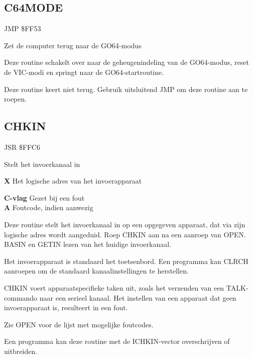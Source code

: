 \subsection{C64MODE}
\label{KERNAL Jump Table!C64MODE}
\begin{description}[leftmargin=2cm,style=nextline]
    \item [Adres:] JMP \$FF53    \item [Omschrijving:] Zet de computer terug naar de GO64-modus    \item [Opmerkingen:]        Deze routine schakelt over naar de geheugenindeling van de GO64-modus, reset de VIC-modi en springt naar de GO64-startroutine.

        Deze routine keert niet terug. Gebruik uitsluitend JMP om deze routine aan te roepen.    \item [Voorbeeld:]
\end{description}



\newpage
\subsection{CHKIN}
\label{KERNAL Jump Table!CHKIN}
\begin{description}[leftmargin=2cm,style=nextline]
    \item [Adres:] JSR \$FFC6    \item [Omschrijving:] Stelt het invoerkanaal in    \item [Invoer:]        \textbf{X} Het logische adres van het invoerapparaat    \item [Uitvoer:]        \textbf{C-vlag} Gezet bij een fout \\        \textbf{A} Foutcode, indien aanwezig    \item [Opmerkingen:]        Deze routine stelt het invoerkanaal in op een opgegeven apparaat, dat via zijn logische adres wordt aangeduid. Roep CHKIN aan na een aanroep van OPEN. BASIN en GETIN lezen van het huidige invoerkanaal.

        Het invoerapparaat is standaard het toetsenbord. Een programma kan CLRCH aanroepen om de standaard kanaalinstellingen te herstellen.

        CHKIN voert apparaatspecifieke taken uit, zoals het verzenden van een TALK-commando naar een serieel kanaal. Het instellen van een apparaat dat geen invoerapparaat is, resulteert in een fout.

        Zie OPEN voor de lijst met mogelijke foutcodes.

        Een programma kan deze routine met de ICHKIN-vector overschrijven of uitbreiden.    \item [Voorbeeld:]
\end{description}


